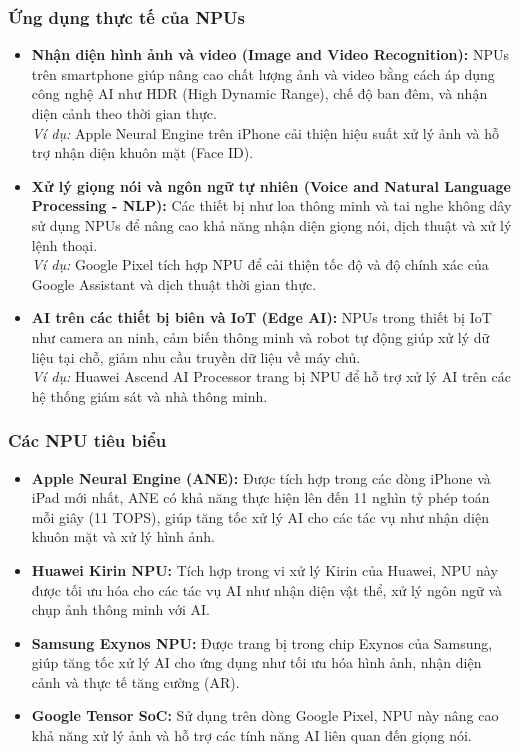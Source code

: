 \documentclass[a4paper]{article}
\begin{document}
\subsubsection{Ứng dụng thực tế của NPUs}
\begin{itemize}
    \item \textbf{Nhận diện hình ảnh và video (Image and Video Recognition):} NPUs trên smartphone giúp nâng cao chất lượng ảnh và video bằng cách áp dụng công nghệ AI như HDR (High Dynamic Range), chế độ ban đêm, và nhận diện cảnh theo thời gian thực. \\
    \textit{Ví dụ:} Apple Neural Engine trên iPhone cải thiện hiệu suất xử lý ảnh và hỗ trợ nhận diện khuôn mặt (Face ID).

    \item \textbf{Xử lý giọng nói và ngôn ngữ tự nhiên (Voice and Natural Language Processing - NLP):} Các thiết bị như loa thông minh và tai nghe không dây sử dụng NPUs để nâng cao khả năng nhận diện giọng nói, dịch thuật và xử lý lệnh thoại. \\
    \textit{Ví dụ:} Google Pixel tích hợp NPU để cải thiện tốc độ và độ chính xác của Google Assistant và dịch thuật thời gian thực.

    \item \textbf{AI trên các thiết bị biên và IoT (Edge AI):} NPUs trong thiết bị IoT như camera an ninh, cảm biến thông minh và robot tự động giúp xử lý dữ liệu tại chỗ, giảm nhu cầu truyền dữ liệu về máy chủ. \\
    \textit{Ví dụ:} Huawei Ascend AI Processor trang bị NPU để hỗ trợ xử lý AI trên các hệ thống giám sát và nhà thông minh.
\end{itemize}

\subsubsection{Các NPU tiêu biểu}
\begin{itemize}
    \item \textbf{Apple Neural Engine (ANE):} Được tích hợp trong các dòng iPhone và iPad mới nhất, ANE có khả năng thực hiện lên đến 11 nghìn tỷ phép toán mỗi giây (11 TOPS), giúp tăng tốc xử lý AI cho các tác vụ như nhận diện khuôn mặt và xử lý hình ảnh.
    
    \item \textbf{Huawei Kirin NPU:} Tích hợp trong vi xử lý Kirin của Huawei, NPU này được tối ưu hóa cho các tác vụ AI như nhận diện vật thể, xử lý ngôn ngữ và chụp ảnh thông minh với AI.
    
    \item \textbf{Samsung Exynos NPU:} Được trang bị trong chip Exynos của Samsung, giúp tăng tốc xử lý AI cho ứng dụng như tối ưu hóa hình ảnh, nhận diện cảnh và thực tế tăng cường (AR).
    
    \item \textbf{Google Tensor SoC:} Sử dụng trên dòng Google Pixel, NPU này nâng cao khả năng xử lý ảnh và hỗ trợ các tính năng AI liên quan đến giọng nói.
\end{itemize}
\end{document}
